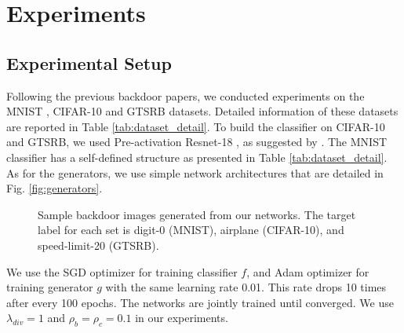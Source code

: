 \documentclass{article}
\begin{document}
\section{Experiments}
\subsection{Experimental Setup}
Following the previous backdoor papers, we conducted experiments on the MNIST \cite{lecun1998gradient}, CIFAR-10 \cite{krizhevsky2009learning} and GTSRB \cite{stallkamp2012man} datasets. Detailed information of these datasets are reported in Table \ref{tab:dataset_detail}. To build the classifier on CIFAR-10 and GTSRB, we used Pre-activation Resnet-18 \cite{he2016identity}, as suggested by \cite{kuangliu2020May}. The MNIST classifier has a self-defined structure as presented in Table \ref{tab:dataset_detail}. As for the generators, we use simple network architectures that are detailed in Fig. \ref{fig:generators}.

\begin{figure}[t]
\vskip 0.05in
\centering
{}
\hspace{2mm}
\hspace{2mm}

\caption{Sample backdoor images generated from our networks. The target label for each set is digit-0 (MNIST), airplane (CIFAR-10), and speed-limit-20 (GTSRB).}
\vspace{-4mm}
\label{fig:bdimages}
\end{figure}

We use the SGD optimizer for training classifier $f$, and Adam optimizer for training generator $g$ with the same learning rate 0.01. This rate drops 10 times after every 100 epochs. The networks are jointly trained until converged. We use $\lambda_{div} = 1$ and $\rho_b = \rho_c = 0.1$ in our experiments. 
\end{document}
